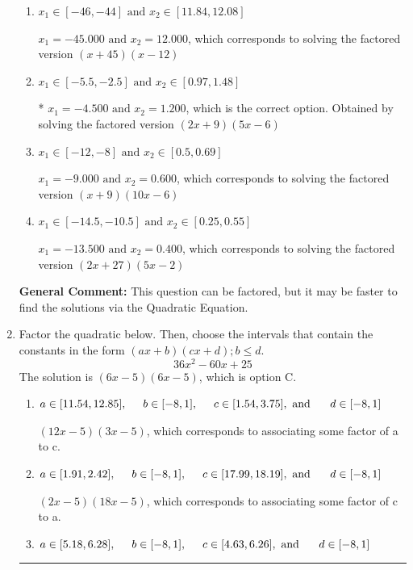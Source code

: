 \documentclass{extbook}[14pt]
\newcommand{\litem}[1]{\item #1

\rule{\textwidth}{0.4pt}}
\begin{document}
\begin{enumerate}
{\begin{enumerate}[label=\Alph*.]
$x_1 = -1.500 \text{ and } x_2 = 3.600$, which corresponds to solving the factored version $(2x + 3)(5x -18)$
\item \( x_1 \in [-46, -44] \text{ and } x_2 \in [11.84, 12.08] \)

$x_1 = -45.000 \text{ and } x_2 = 12.000$, which corresponds to solving the factored version $(x + 45)(x -12)$
\item \( x_1 \in [-5.5, -2.5] \text{ and } x_2 \in [0.97, 1.48] \)

* $x_1 = -4.500 \text{ and } x_2 = 1.200$, which is the correct option. Obtained by solving the factored version $(2x + 9)(5x -6)$
\item \( x_1 \in [-12, -8] \text{ and } x_2 \in [0.5, 0.69] \)

$x_1 = -9.000 \text{ and } x_2 = 0.600$, which corresponds to solving the factored version $(x + 9)(10x -6)$
\item \( x_1 \in [-14.5, -10.5] \text{ and } x_2 \in [0.25, 0.55] \)

$x_1 = -13.500 \text{ and } x_2 = 0.400$, which corresponds to solving the factored version $(2x + 27)(5x -2)$
\end{enumerate}

\textbf{General Comment:} This question can be factored, but it may be faster to find the solutions via the Quadratic Equation.
}
\litem{
Factor the quadratic below. Then, choose the intervals that contain the constants in the form $(ax+b)(cx+d); b \leq d.$
\[ 36x^{2} -60 x + 25 \]
The solution is \( (6x -5)(6x -5) \), which is option C.\begin{enumerate}[label=\Alph*.]
\item \( a \in [11.54, 12.85], \hspace*{5mm} b \in [-8, 1], \hspace*{5mm} c \in [1.54, 3.75], \text{ and } \hspace*{5mm} d \in [-8, 1] \)

 $(12x -5)(3x -5)$, which corresponds to associating some factor of a to c.
\item \( a \in [1.91, 2.42], \hspace*{5mm} b \in [-8, 1], \hspace*{5mm} c \in [17.99, 18.19], \text{ and } \hspace*{5mm} d \in [-8, 1] \)

 $(2x -5)(18x -5)$, which corresponds to associating some factor of c to a.
\item \( a \in [5.18, 6.28], \hspace*{5mm} b \in [-8, 1], \hspace*{5mm} c \in [4.63, 6.26], \text{ and } \hspace*{5mm} d \in [-8, 1] \)


\end{enumerate}}
\end{enumerate}
\end{document}
